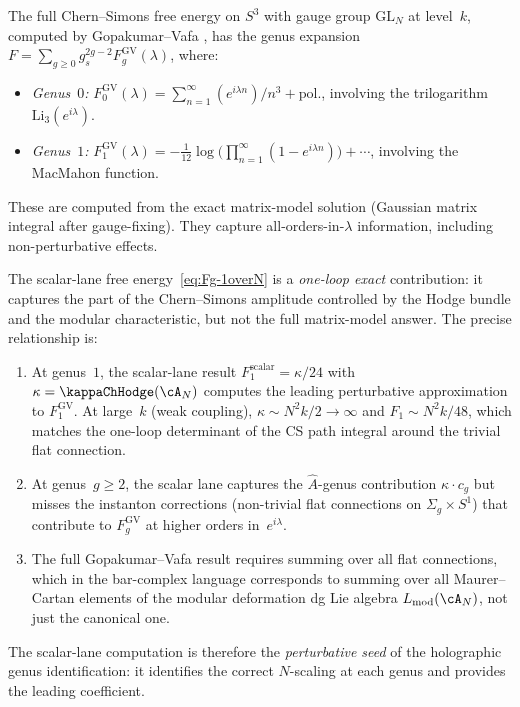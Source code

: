 \begin{remark}
\label{rem:gopakumar-vafa-comparison}
The full Chern--Simons free energy on $S^3$ with gauge group
$\mathrm{GL}_N$ at level~$k$, computed by Gopakumar--Vafa
\cite{GV99}, has the genus expansion
$F = \sum_{g \ge 0} g_s^{2g-2} F_g^{\mathrm{GV}}(\lambda)$,
where:
\begin{itemize}
\item \emph{Genus~$0$:} $F_0^{\mathrm{GV}}(\lambda) = \sum_{n=1}^\infty
 (e^{i\lambda n})/n^3 + \mathrm{pol.}$, involving the trilogarithm
 $\mathrm{Li}_3(e^{i\lambda})$.
\item \emph{Genus~$1$:} $F_1^{\mathrm{GV}}(\lambda) = -\frac{1}{12}\log
 \bigl(\prod_{n=1}^\infty (1 - e^{i\lambda n})\bigr) + \cdots$,
 involving the MacMahon function.
\end{itemize}
These are computed from the exact matrix-model solution (Gaussian
matrix integral after gauge-fixing). They capture all-orders-in-$\lambda$
information, including non-perturbative effects.

The scalar-lane free energy~\eqref{eq:Fg-1overN} is a
\emph{one-loop exact} contribution: it captures the part of the
Chern--Simons amplitude controlled by the Hodge bundle and the modular
characteristic, but not the full matrix-model answer. The precise
relationship is:
\begin{enumerate}[label=\textup{(\alph*)}]
\item At genus~$1$, the scalar-lane result $F_1^{\mathrm{scalar}}
 = \kappa/24$ with $\kappa = \kappaChHodge(\cA_N)$
 computes the leading perturbative
 approximation to $F_1^{\mathrm{GV}}$. At large~$k$ (weak coupling),
 $\kappa \sim N^2 k/2 \to \infty$ and $F_1 \sim N^2 k/48$, which
 matches the one-loop determinant of the CS path integral around the
 trivial flat connection.
\item At genus~$g \geq 2$, the scalar lane captures the
 $\hat{A}$-genus contribution $\kappa \cdot c_g$ but misses
 the instanton corrections (non-trivial flat connections on
 $\Sigma_g \times S^1$) that contribute to $F_g^{\mathrm{GV}}$ at
 higher orders in~$e^{i\lambda}$.
\item The full Gopakumar--Vafa result requires summing over all flat
 connections, which in the bar-complex language corresponds to summing
 over all Maurer--Cartan elements of the modular deformation dg
 Lie algebra $L_{\mathrm{mod}}(\cA_N)$, not just the canonical one.
\end{enumerate}
The scalar-lane computation is therefore the \emph{perturbative seed}
of the holographic genus identification: it identifies the
correct $N$-scaling at each genus and provides the leading
coefficient.
\end{remark}


